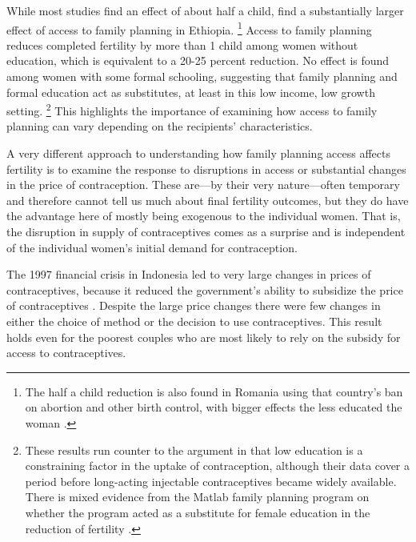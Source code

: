 \documentclass[letterpaper,12pt]{article}
\begin{document}
While most studies find an effect of about half a child,
\citet{Portner2011} find a substantially larger effect of access to
family planning in Ethiopia.%
\footnote{
The half a child reduction is also found in Romania using that country's
ban on abortion and other birth control, with bigger effects the less
educated the woman \citep{Pop-Eleches2010}.} 
Access to family planning reduces completed fertility by more than 1
child among women without education, which is equivalent to a 20-25
percent reduction. 
No effect is found among women with some formal schooling, suggesting
that family planning and formal education act as substitutes, at least
in this low income, low growth setting.%
\footnote{
These results run counter to the argument in \citet{Feyisetan1996} that
low education is a constraining factor in the uptake of contraception,
although their data cover a period before long-acting injectable
contraceptives became widely available. 
There is mixed evidence from the Matlab family planning program on
whether the program acted as a substitute for female education in the
reduction of fertility \citep{Sinha2005,Joshi2007}.} 
This highlights the importance of examining how access to family
planning can vary depending on the recipients' characteristics.

A very different approach to understanding how family planning access
affects fertility is to examine the response to disruptions in access or
substantial changes in the price of contraception. 
These are---by their very nature---often temporary and therefore cannot
tell us much about final fertility outcomes, but they do have the
advantage here of mostly being exogenous to the individual women. 
That is, the disruption in supply of contraceptives comes as a surprise
and is independent of the individual women's initial demand for
contraception.

The 1997 financial crisis in Indonesia led to very large changes in
prices of contraceptives, because it reduced the government's ability to
subsidize the price of contraceptives \citep{McKelvey2012}. 
Despite the large price changes there were few changes in either the
choice of method or the decision to use contraceptives. 
This result holds even for the poorest couples who are most likely to
rely on the subsidy for access to contraceptives.
\end{document}
